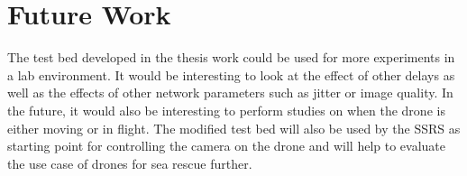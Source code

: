 \documentclass[nofilelist]{cslthse-msc}
\begin{document}
\chapter{Future Work}
The test bed developed in the thesis work could be used for more experiments in a lab environment. It would be interesting to look at the effect of other delays as well as the effects of other network parameters such as jitter or image quality. In the future, it would also be interesting to perform studies on when the drone is either moving or in flight.
The modified test bed will also be used by the SSRS as starting point for controlling the camera on the drone and will help to evaluate the use case of drones for sea rescue further.

{}
\end{document}
